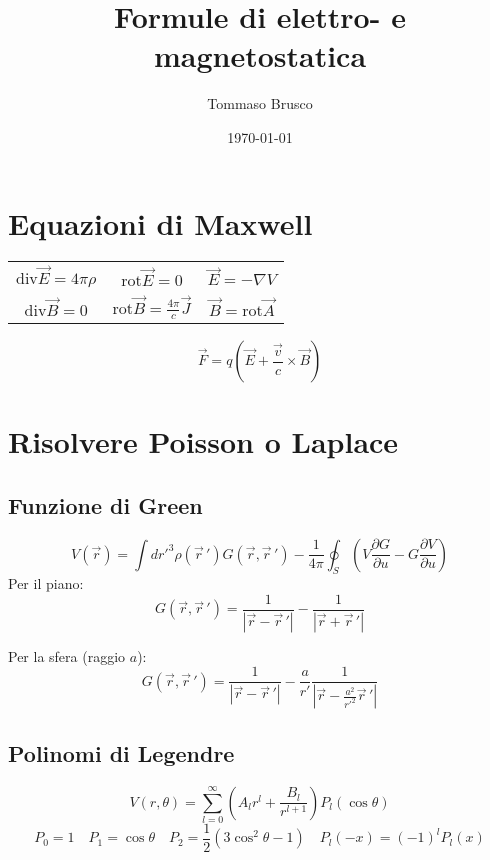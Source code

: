 \documentclass[a4paper, 11pt]{article}
\author{Tommaso Brusco}
\title{Formule di elettro- e magnetostatica}
\date{\today}
\renewcommand{\div}{\mathrm{div}}
\newcommand{\rot}{\mathrm{rot}}
\begin{document}
	\maketitle

	\section{Equazioni di Maxwell}
	\label{maxwell}
	\begin{table}[h!]
		\centering
		\label{tab:maxwell}
		\begin{tabular}{ccc}
			$\div\vec{E}=4\pi\rho$ & $\rot\vec{E}=0$ & $\vec{E} = -\nabla V $\\[5pt]
			$\div\vec{B}=0$ & $\rot\vec{B}=\frac{4\pi}{c}\vec{J}$ & $\vec{B}=\rot\vec{A}$\\
		\end{tabular}
	\end{table}

	$$\vec{F} = q\left(\vec{E}+\frac{\vec{v}}{c}\times\vec{B}\right)$$

	\section{Risolvere Poisson o Laplace}
	\label{poislap}
	\subsection{Funzione di Green}
	$$V\left(\vec{r}  \right) = \int dr'^3 \rho\left( \vec{r}\,' \right) G\left( \vec{r}, \vec{r}\,' \right) - \frac{1}{4\pi}\oint _S \left( V \frac{\partial G}{\partial u} - G \frac{\partial V}{\partial u} \right) $$
	Per il piano:
	$$G\left( \vec{r}, \vec{r}\,' \right) = \frac{1}{|\vec{r} - \vec{r}\,'|} - \frac{1}{|\vec{r} + \vec{r}\,'|}$$

	Per la sfera (raggio $a$):
	$$G\left( \vec{r}, \vec{r}\,' \right) = \frac{1}{|\vec{r} - \vec{r}\,'|} - \frac{a}{r'} \frac{1}{|\vec{r} - \frac{a^2}{r'^2} \vec{r}\,'|}$$

	\subsection{Polinomi di Legendre}
	$$V\left( r, \theta \right) = \sum_{l=0}^{\infty} \left( A_l r^l + \frac{B_l}{r^{l+1}} \right) P_l\left( \cos\theta \right) $$
	$$P_0 = 1 \quad P_1 = \cos\theta \quad P_2 = \frac{1}{2}\left( 3\cos ^2 \theta - 1 \right) \quad P_l\left( -x \right) = \left( -1 \right) ^l P_l \left( x \right) $$
\end{document}
